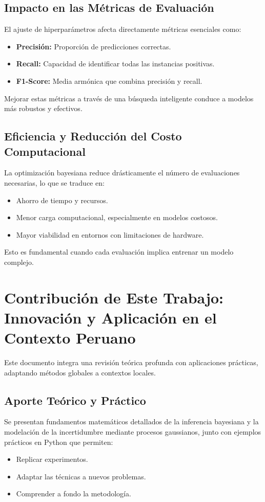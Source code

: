 \documentclass[12pt]{article}
\begin{document}
	\subsection{Impacto en las Métricas de Evaluación}
	El ajuste de hiperparámetros afecta directamente métricas esenciales como:
	\begin{itemize}[leftmargin=1.5cm]
		\item \textbf{Precisión:} Proporción de predicciones correctas.
		\item \textbf{Recall:} Capacidad de identificar todas las instancias positivas.
		\item \textbf{F1-Score:} Media armónica que combina precisión y recall.
	\end{itemize}
	Mejorar estas métricas a través de una búsqueda inteligente conduce a modelos más robustos y efectivos.  
	\lipsum[7]
	
	\subsection{Eficiencia y Reducción del Costo Computacional}
	La optimización bayesiana reduce drásticamente el número de evaluaciones necesarias, lo que se traduce en:
	\begin{itemize}[leftmargin=1.5cm]
		\item Ahorro de tiempo y recursos.
		\item Menor carga computacional, especialmente en modelos costosos.
		\item Mayor viabilidad en entornos con limitaciones de hardware.
	\end{itemize}
	Esto es fundamental cuando cada evaluación implica entrenar un modelo complejo.  
	\lipsum[8]
	
	\section{Contribución de Este Trabajo: Innovación y Aplicación en el Contexto Peruano}
	Este documento integra una revisión teórica profunda con aplicaciones prácticas, adaptando métodos globales a contextos locales.
	
	\subsection{Aporte Teórico y Práctico}
	Se presentan fundamentos matemáticos detallados de la inferencia bayesiana y la modelación de la incertidumbre mediante procesos gaussianos, junto con ejemplos prácticos en Python que permiten:
	\begin{itemize}[leftmargin=1.5cm]
		\item Replicar experimentos.
		\item Adaptar las técnicas a nuevos problemas.
		\item Comprender a fondo la metodología.
	\end{itemize}
	\lipsum[9]
	
\end{document}
